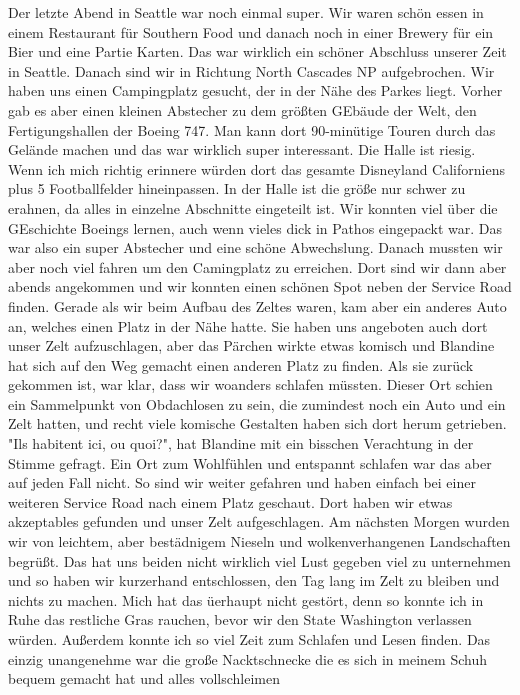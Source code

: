 \documentclass[11pt]{book}
\begin{document}
Der letzte Abend in Seattle war noch einmal super. Wir waren schön essen in einem Restaurant für Southern Food und danach noch in einer Brewery für 
ein Bier und eine Partie Karten. Das war wirklich ein schöner Abschluss unserer Zeit in Seattle. Danach sind wir in Richtung North Cascades NP aufgebrochen. 
Wir haben uns einen Campingplatz gesucht, der in der Nähe des Parkes liegt. Vorher gab es aber einen kleinen Abstecher zu dem größten GEbäude der Welt, 
den Fertigungshallen der Boeing 747. Man kann dort 90-minütige Touren durch das Gelände machen und das war wirklich super interessant. Die Halle ist riesig. Wenn ich 
mich richtig erinnere würden dort das gesamte Disneyland Californiens plus 5 Footballfelder hineinpassen. In der Halle ist die größe nur schwer zu erahnen, 
da alles in einzelne Abschnitte eingeteilt ist. Wir konnten viel über die GEschichte Boeings lernen, auch wenn vieles dick in Pathos eingepackt war. 
Das war also ein super Abstecher und eine schöne Abwechslung. Danach mussten wir aber noch viel fahren um den Camingplatz zu erreichen. Dort sind 
wir dann aber abends angekommen und wir konnten einen schönen Spot neben der Service Road finden. Gerade als wir beim Aufbau des Zeltes waren, kam 
aber ein anderes Auto an, welches einen Platz in der Nähe hatte. Sie haben uns angeboten auch dort unser Zelt aufzuschlagen, aber das Pärchen wirkte etwas 
komisch und Blandine hat sich auf den Weg gemacht einen anderen Platz zu finden. Als sie zurück gekommen ist, war klar, dass wir woanders schlafen müssten. 
Dieser Ort schien ein Sammelpunkt von Obdachlosen zu sein, die zumindest noch ein Auto und ein Zelt hatten, und recht viele komische Gestalten haben 
sich dort herum getrieben. "Ils habitent ici, ou quoi?", hat Blandine mit ein bisschen Verachtung in der Stimme gefragt. Ein Ort zum Wohlfühlen und entspannt 
schlafen war das aber auf jeden Fall nicht. So sind wir weiter gefahren und haben einfach bei einer weiteren Service Road nach einem Platz geschaut. 
Dort haben wir etwas akzeptables gefunden und unser Zelt aufgeschlagen. 
Am nächsten Morgen wurden wir von leichtem, aber bestädnigem Nieseln und wolkenverhangenen Landschaften begrüßt. Das hat uns beiden nicht wirklich viel 
Lust gegeben viel zu unternehmen und so haben wir kurzerhand entschlossen, den Tag lang im Zelt zu bleiben und nichts zu machen. Mich hat das üerhaupt 
nicht gestört, denn so konnte ich in Ruhe das restliche Gras rauchen, bevor wir den State Washington verlassen würden. Außerdem konnte ich so viel Zeit 
zum Schlafen und Lesen finden. Das einzig unangenehme war die große Nacktschnecke die es sich in meinem Schuh bequem gemacht hat und alles vollschleimen 
\end{document}
